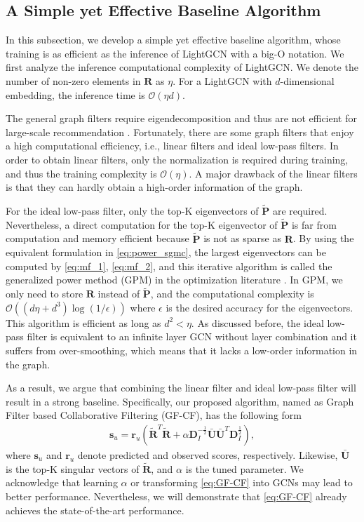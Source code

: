 \documentclass[sigconf]{acmart}
\begin{document}
\subsection{A Simple yet Effective Baseline Algorithm}
In this subsection, we develop a simple yet effective baseline algorithm, whose training is as efficient as the inference of LightGCN with a big-O notation. We first analyze the inference computational complexity of LightGCN. We denote the number of non-zero elements in $\bm{R}$ as $\eta$. For a LightGCN with $d$-dimensional embedding, the inference time is $\mathcal{O}(\eta d)$.


The general graph filters require eigendecomposition and thus are not efficient for large-scale recommendation \cite{he2020lightgcn}. Fortunately, there are some graph filters that enjoy a  high computational efficiency, i.e., linear filters and ideal low-pass filters. In order to obtain linear filters, only the normalization is required during training, and thus the training complexity is $\mathcal{O}(\eta)$. A major drawback of the linear filters is that they can hardly obtain a high-order information of the graph. 

For the ideal low-pass filter, only the top-K eigenvectors of $\tilde{\bm{P}}$ are required. Nevertheless, a direct computation for the  top-K eigenvector of $\tilde{\bm{P}}$ is far from computation and memory efficient because $\tilde{\bm{P}}$ is not as sparse as $\bm{R}$. By using the equivalent formulation in \eqref{eq:power_sgmc}, the largest eigenvectors can be computed by \eqref{eq:mf_1}, \eqref{eq:mf_2}, and this iterative algorithm is called the generalized power method (GPM) in the optimization literature \cite{journee2010generalized}. In GPM, we only need to store $\bm{R}$ instead of $\tilde{\bm{P}}$, and the computational complexity is $\mathcal{O}((d\eta + d^3)\log(1/\epsilon))$ where $\epsilon$ is the desired accuracy for the eigenvectors. This algorithm is efficient as long as $d^2 < \eta$. As discussed before, the ideal low-pass filter is equivalent to an infinite layer GCN without layer combination and it suffers from over-smoothing, which means that it lacks a low-order information in the graph. 

As a result, we argue that combining the linear filter and ideal low-pass filter will result in a strong baseline. Specifically, our proposed algorithm, named as Graph
Filter based Collaborative Filtering (GF-CF), has the following form
\begin{align} \label{eq:GF-CF}
    \bm{s}_u = \bm{r}_u\left( \tilde{\bm{R}}^T \tilde{\bm{R}} +  \alpha\bm{D}_I^{-\frac{1}{2}}\bar{\bm{U}}\bar{\bm{U}}^T \bm{D}_I^{\frac{1}{2}} \right),
\end{align}
where $\bm{s}_u$ and $\bm{r}_u$ denote predicted and observed scores, respectively. Likewise, $\bar{\bm{U}}$ is the top-K singular vectors of $\tilde{\bm{R}}$, and $\alpha$ is the tuned parameter. We acknowledge that learning $\alpha$ or transforming \eqref{eq:GF-CF} into GCNs may lead to better performance. Nevertheless, we will demonstrate that \eqref{eq:GF-CF} already achieves the state-of-the-art performance. 
\end{document}
